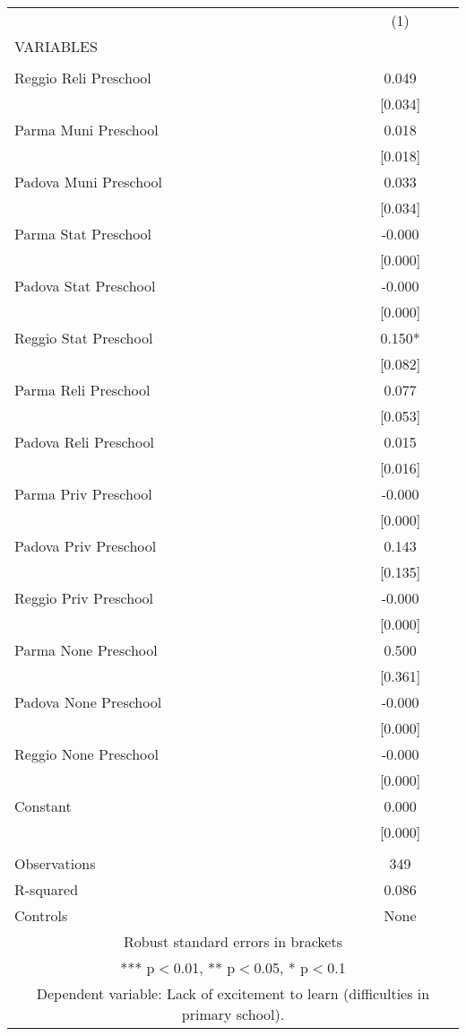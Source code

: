 \begin{tabular}{lc} \hline
 & (1) \\
VARIABLES &  \\ \hline
 &  \\
Reggio Reli Preschool & 0.049 \\
 & [0.034] \\
Parma Muni Preschool & 0.018 \\
 & [0.018] \\
Padova Muni Preschool & 0.033 \\
 & [0.034] \\
Parma Stat Preschool & -0.000 \\
 & [0.000] \\
Padova Stat Preschool & -0.000 \\
 & [0.000] \\
Reggio Stat Preschool & 0.150* \\
 & [0.082] \\
Parma Reli Preschool & 0.077 \\
 & [0.053] \\
Padova Reli Preschool & 0.015 \\
 & [0.016] \\
Parma Priv Preschool & -0.000 \\
 & [0.000] \\
Padova Priv Preschool & 0.143 \\
 & [0.135] \\
Reggio Priv Preschool & -0.000 \\
 & [0.000] \\
Parma None Preschool & 0.500 \\
 & [0.361] \\
Padova None Preschool & -0.000 \\
 & [0.000] \\
Reggio None Preschool & -0.000 \\
 & [0.000] \\
Constant & 0.000 \\
 & [0.000] \\
 &  \\
Observations & 349 \\
R-squared & 0.086 \\
 Controls & None \\ \hline
\multicolumn{2}{c}{ Robust standard errors in brackets} \\
\multicolumn{2}{c}{ *** p$<$0.01, ** p$<$0.05, * p$<$0.1} \\
\multicolumn{2}{c}{ Dependent variable: Lack of excitement to learn (difficulties in primary school).} \\
\end{tabular}
